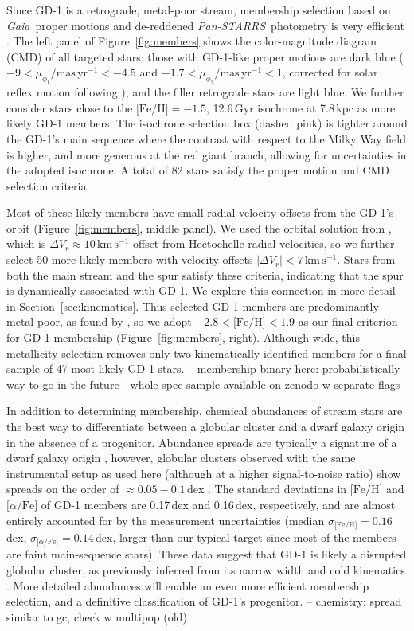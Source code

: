 \documentclass[twocolumn]{aastex63}
\newcommand{\gaia}{\textsl{Gaia}}
\newcommand{\pans}{\textsl{Pan-STARRS}}
\newcommand{\kms}{\ensuremath{\textrm{km}\,\textrm{s}^{-1}}}
\newcommand{\masyr}{\ensuremath{\textrm{mas}\,\textrm{yr}^{-1}}}
\newcommand{\feh}{\ensuremath{\textrm{[Fe/H]}}}
\newcommand{\afe}{\ensuremath{\textrm{[$\alpha$/Fe]}}}
\begin{document}
Since GD-1 is a retrograde, metal-poor stream, membership selection based on \gaia\ proper motions \citep{gdr2} and de-reddened \pans\ photometry \citep{sfd, ps1} is very efficient \citep[e.g.,][]{pwb}.
The left panel of Figure~\ref{fig:members} shows the color-magnitude diagram (CMD) of all targeted stars: those with GD-1-like proper motions are dark blue ($-9<\mu_{\phi_1}/\masyr<-4.5$ and $-1.7<\mu_{\phi_2}/\masyr<1$, corrected for solar reflex motion following \citealt{pwb}), and the filler retrograde stars are light blue.
We further consider stars close to the $\textrm{[Fe/H]}=-1.5$, 12.6\,Gyr isochrone at 7.8\,kpc \citep{choi2016} as more likely GD-1 members.
The isochrone selection box (dashed pink) is tighter around the GD-1's main sequence where the contrast with respect to the Milky Way field is higher, and more generous at the red giant branch, allowing for uncertainties in the adopted isochrone.
A total of 82 stars satisfy the proper motion and CMD selection criteria.

Most of these likely members have small radial velocity offsets from the GD-1's orbit (Figure~\ref{fig:members}, middle panel).
We used the orbital solution from \citet{pwb}, which is $\Delta V_r\approx10\,\kms$ offset from Hectochelle radial velocities, so we further select 50 more likely members with velocity offsets $|\Delta V_r| < 7\,\kms$.
Stars from both the main stream and the spur satisfy these criteria, indicating that the spur is dynamically associated with GD-1.
We explore this connection in more detail in Section~\ref{sec:kinematics}.
% 
Thus selected GD-1 members are predominantly metal-poor, as found by \citet{malhan2019}, so we adopt $-2.8<\feh<1.9$ as our final criterion for GD-1 membership (Figure~\ref{fig:members}, right).
Although wide, this metallicity selection removes only two kinematically identified members for a final sample of 47 most likely GD-1 stars.
-- membership binary here: probabilistically way to go in the future
- whole spec sample available on zenodo w separate flags

In addition to determining membership, chemical abundances of stream stars are the best way to differentiate between a globular cluster and a dwarf galaxy origin in the absence of a progenitor.
Abundance spreads are typically a signature of a dwarf galaxy origin \citep[e.g.,][]{willman2012}, however, globular clusters observed with the same instrumental setup as used here (although at a higher signal-to-noise ratio) show spreads on the order of $\approx0.05-0.1$\,dex \citep{cargile2019}.
The standard deviations in $\feh$ and $\afe$ of GD-1 members are 0.17\,dex and 0.16\,dex, respectively, and are almost entirely accounted for by the measurement uncertainties (median $\sigma_\feh=0.16$\,dex, $\sigma_\afe=0.14$\,dex, larger than our typical target since most of the members are faint main-sequence stars).
These data suggest that GD-1 is likely a disrupted globular cluster, as previously inferred from its narrow width \citep[e.g.,][]{grillmair2006} and cold kinematics \citep[e.g.,][]{malhan2019}.
More detailed abundances will enable an even more efficient membership selection, and a definitive classification of GD-1's progenitor.
-- chemistry: spread similar to gc, check w multipop (old)
\end{document}
